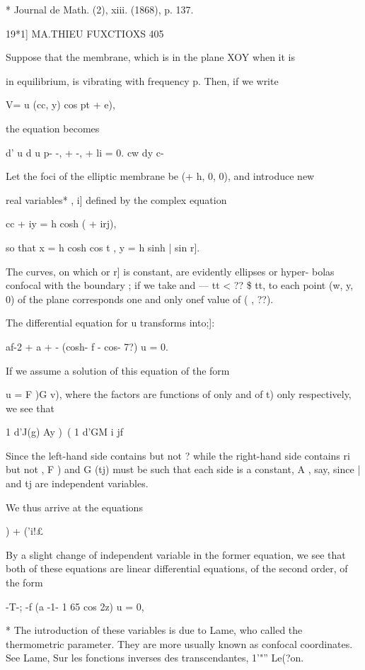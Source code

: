 * Journal de Math. (2), xiii. (1868), p. 137. 



19*1] MA.THIEU FUXCTIOXS 405 

Suppose that the membrane, which is in the plane XOY when it is 

in equilibrium, is vibrating with frequency p. Then, if we write 

V= u (cc, y) cos  pt + e), 

the equation becomes 

d' u d u p-   
 -, +  -, +   li = 0. 
cw dy  c- 

Let the foci of the elliptic membrane be (+ h, 0, 0), and introduce new 

real variables*  , i] defined by the complex equation 

cc + iy = h cosh (  + irj), 

so that x = h cosh   cos t , y = h sinh | sin r]. 

The curves, on which   or r] is constant, are evidently ellipses or hyper- 
bolas confocal with the boundary ; if we take   and — tt < ?? \$ tt, to each 
point (w, y, 0) of the plane corresponds one and only onef value of ( , ??). 

The differential equation for u transforms into;]: 

af-2 + a  + -  (cosh- f - cos- 7?) u = 0. 

If we assume a solution of this equation of the form 

u = F  )G v), 
where the factors are functions of   only and of t) only respectively, we see 
that 

1 d'J(g) Ay )\  ( 1 d'GM i jf 

Since the left-hand side contains   but not ?  while the right-hand side 
contains ri but not  , F   ) and G (tj) must be such that each side is a constant, 
A , say, since | and tj are independent variables. 

We thus arrive at the equations 

 ) + ('i!£%

By a slight change of independent variable in the former equation, we see 
that both of these equations are linear differential equations, of the second 
order, of the form 

-T-; -f (a -1- 1 65 cos 2z) u = 0, 

* The iutroduction of these variables is due to Lame, who called   the thermometric parameter. 
They are more usually known as confocal coordinates. See Lame, Sur les fonctions inverses des 
transcendantes, 1'"''  Le(?on. 

